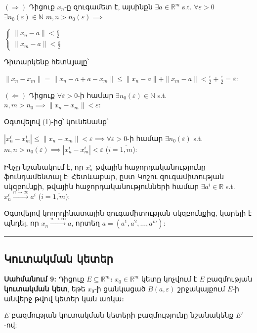 \documentclass[12pt, a4paper]{article}
\begin{document}
$(\Rightarrow)$ Դիցուք $x_n$-ը զուգամետ է, այսինքն $\exists a \in \mathbb{R}^m$ s.t. $\forall \varepsilon > 0$ $\exists n_0(\varepsilon) \in \mathbb{N}$ $m, n > n_0(\varepsilon) \implies$

$\begin{cases} \|x_n - a\| < \frac{\varepsilon}{2} \\ \|x_m - a\| < \frac{\varepsilon}{2} \end{cases}$

Դիտարկենք հետևյալը՝

$\|x_n - x_m\| = \|x_n - a + a - x_m\| \le \|x_n - a\| + \|x_m - a\| < \frac{\varepsilon}{2} + \frac{\varepsilon}{2} = \varepsilon$:

$(\Leftarrow)$ Դիցուք $\forall \varepsilon > 0$-ի համար $\exists n_0(\varepsilon) \in \mathbb{N}$ s.t. $n, m > n_0 \implies \|x_n - x_m\| < \varepsilon$:

Օգտվելով (1)-ից՝ կունենանք՝

$|x_n^i - x_m^i| \le \|x_n - x_m\| < \varepsilon \implies \forall \varepsilon > 0$-ի համար $\exists n_0(\varepsilon)$ s.t. $m, n > n_0(\varepsilon) \implies |x_n^i - x_m^i| < \varepsilon$ ($i = \overline{1, m}$):

Ինչը նշանակում է, որ $x_n^i$ թվային հաջորդականությունը ֆունդամենտալ է: Հետևաբար, ըստ Կոշու զուգամիտության սկզբունքի, թվային հաջորդականությունների համար $\exists a^i \in \mathbb{R}$ s.t. $x_n^i \overset{n \to \infty}{\longrightarrow} a^i$ ($i = \overline{1, m}$):

Օգտվելով կոորդինատային զուգամիտության սկզբունքից, կարելի է պնդել, որ $x_n \overset{n \to \infty}{\longrightarrow} a$, որտեղ $a=(a^1, a^2, \dots, a^m)$:

\vspace{1em}
\hrule
\vspace{1em}

\subsection{Կուտակման կետեր}

\textbf{Սահմանում 9:} Դիցուք $E \subseteq \mathbb{R}^m$։ $x_0 \in \mathbb{R}^m$ կետը կոչվում է $E$ բազմության \textbf{կուտակման կետ}, եթե $x_0$-ի ցանկացած $B(a, \varepsilon)$ շրջակայքում $E$-ի անվերջ թվով կետեր կան առկա։ 

$E$ բազմության կուտակման կետերի բազմությունը նշանակենք $E'$-ով:
\end{document}
